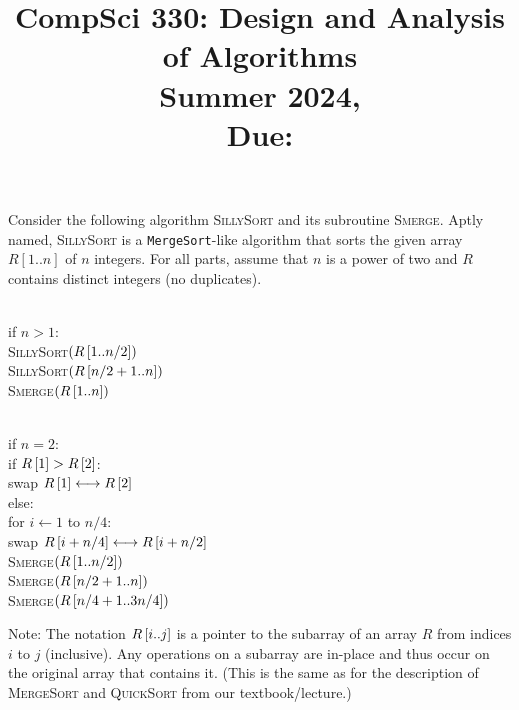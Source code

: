 \documentclass[11pt]{article}
\title{CompSci 330: Design and Analysis of Algorithms\\Summer 2024, \assignmentTitle{} \\ Due: \assignmentDueDate{}}
\date{}
\begin{document}

\begin{question}

Consider the following algorithm \textsc{SillySort} and its subroutine \textsc{Smerge}. Aptly named, \textsc{SillySort} is a \texttt{MergeSort}-like algorithm that sorts the given array $R[1..n]$ of $n$ integers. For all parts, assume that $n$ is a power of two and $R$ contains distinct integers (no duplicates).

    \begin{algo} 
        \textsc{} \\ 
        \> if $n > 1$:\\
        \> \> \textsc{SillySort$(R\left[ 1..n/2 \right])$} \\
        \> \> \textsc{SillySort$(R\left[ n/2+1..n \right])$} \\
        \> \> \textsc{Smerge$(R\left[ 1..n \right])$}
        \end{algo}
        \begin{algo}
        \textsc{} \\ 
        \> if $n =2$:\\
        \> \>  if $R\left[ 1 \right] > R\left[ 2 \right]$:\\
        \> \> \> swap $R\left[ 1 \right] \longleftrightarrow R\left[ 2 \right]$ \\
        \> else: \\
        \> \> for $i \gets 1$ to $n/4$:\\
        \> \> \> swap $R\left[ i+n/4 \right] \longleftrightarrow R\left[ i+n/2 \right]$ \qquad{}\\
        \> \> \textsc{Smerge$(R\left[ 1..n/2 \right])$} \qquad{}\\
        \> \> \textsc{Smerge$(R\left[ n/2+1..n \right])$} \qquad{}\\
        \> \> \textsc{Smerge$(R\left[ n/4+1..3n/4 \right])$} \qquad{}
        \end{algo}

        Note: The notation $R\left[ i..j \right]$ is a pointer to the subarray of an array $R$ from indices $i$ to $j$ (inclusive). Any operations on a subarray are in-place and thus occur on the original array that contains it. (This is the same as for the description of \textsc{MergeSort} and \textsc{QuickSort} from our textbook/lecture.)


\end{question}
\end{document}
